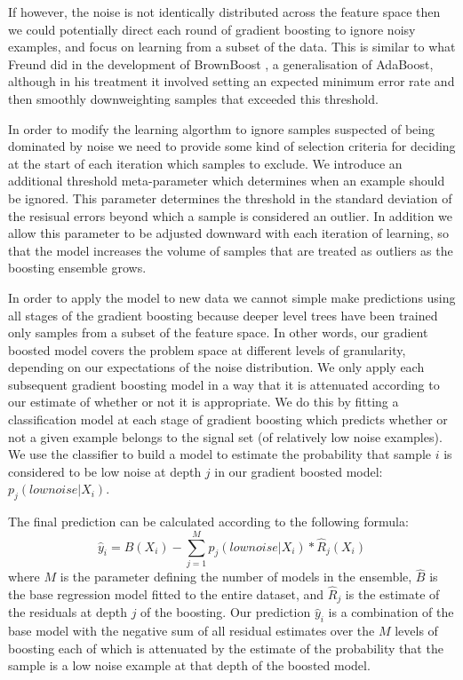 \documentclass[graybox]{svmult}
\begin{document}
If however, the noise is not identically distributed across the feature space then we could potentially direct each round of
gradient boosting to ignore noisy examples, and focus on learning from a subset of the data. This is similar to what Freund
did in the development of BrownBoost \cite{Freund2001}, a generalisation of AdaBoost, although in his treatment it involved
setting an expected minimum error rate and then smoothly downweighting samples that exceeded this threshold.

In order to modify the learning algorthm to ignore samples suspected of being dominated by noise we need to provide some
kind of selection criteria for deciding at the start of each iteration which samples to exclude.
We introduce an additional threshold meta-parameter which determines when an example should be ignored. This parameter
determines the threshold in the standard deviation of the resisual errors beyond which a sample is considered an outlier.
In addition we allow this parameter to be adjusted downward with each iteration of learning, so that the model 
increases the volume of samples that are treated as outliers as the boosting ensemble grows.

In order to apply the model to new data we cannot simple make predictions using all stages of the gradient boosting because
deeper level trees have been trained only samples from a subset of the feature space. In other words, our gradient boosted model
covers the problem space at different levels of granularity, depending on our expectations of the noise distribution.
We only apply each subsequent gradient boosting model in a way that it is attenuated according to our estimate of
whether or not it is appropriate. We do this by fitting a classification model at each stage of gradient boosting which predicts
whether or not a given example belongs to the signal set (of relatively low noise examples). We use the classifier to
build a model to estimate the probability that sample $i$ is considered to be low noise at depth $j$ in our gradient 
boosted model: $p_j(low noise | X_i )$.

The final prediction can be calculated according to the following formula:
%
\begin{equation}
\hat{y}_i = \hat{B}(X_i) - \sum_{j=1}^M p_j(low noise | X_i) * \hat{R}_j(X_i)
\label{eq:pred}
\end{equation}
%
where $M$ is the parameter defining the number of models in the ensemble, $\hat{B}$ is the base regression model fitted to the
entire dataset, and $\hat{R}_j$ is the estimate of the residuals at depth $j$ of the boosting.
Our prediction $\hat{y}_i$ is a combination of the base model with the negative sum of all residual estimates over the $M$ 
levels of boosting each of which is attenuated by the estimate of the probability that the sample is a low noise example at that 
depth of the boosted model.
\end{document}
